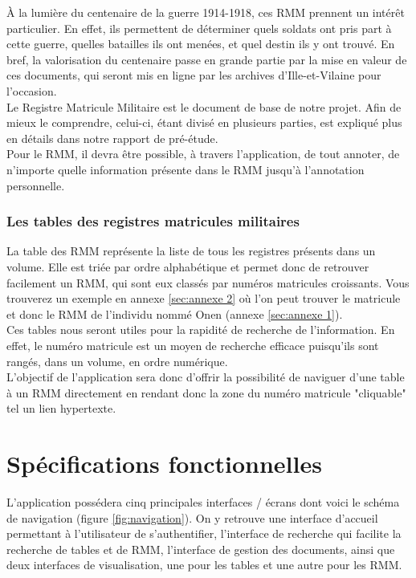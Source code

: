 \documentclass[a4paper]{article}
\begin{document}
	\`A la lumière du centenaire de la guerre 1914-1918, ces RMM prennent un intérêt particulier. En effet, ils permettent de déterminer quels soldats ont pris part à cette guerre, quelles batailles ils ont menées, et quel destin ils y ont trouvé. En bref, la valorisation du centenaire passe en grande partie par la mise en valeur de ces documents, qui seront mis en ligne par les archives d'Ille-et-Vilaine pour l'occasion.\\

	Le Registre Matricule Militaire est le document de base de notre projet. Afin de mieux le comprendre, celui-ci, étant divisé en plusieurs parties, est expliqué plus en détails dans notre rapport de pré-étude.\\

	Pour le RMM, il devra être possible, à travers l'application, de tout annoter, de n'importe quelle information présente dans le RMM jusqu'à l'annotation personnelle. 

\subsubsection{Les tables des registres matricules militaires}
	La table des RMM représente la liste de tous les registres présents dans un volume. Elle est triée par ordre alphabétique et permet donc de retrouver facilement un RMM, qui sont eux classés par numéros matricules croissants. Vous trouverez un exemple en annexe \ref{sec:annexe 2} où l'on peut trouver le matricule et donc le RMM de l'individu nommé Onen (annexe \ref{sec:annexe 1}).\\

	Ces tables nous seront utiles pour la rapidité de recherche de l'information. En effet, le numéro matricule est un moyen de recherche efficace puisqu'ils sont rangés, dans un volume, en ordre numérique. \\

	L'objectif de l'application sera donc d'offrir la possibilité de naviguer d'une table à un RMM directement en rendant donc la zone du numéro matricule "cliquable" tel un lien hypertexte.\\

\section{Spécifications fonctionnelles}

	L’application possédera cinq principales interfaces / écrans dont voici le schéma de navigation (figure \ref{fig:navigation}). On y retrouve une interface d'accueil permettant à l'utilisateur de s'authentifier, l'interface de recherche qui facilite la recherche de tables et de RMM, l'interface de gestion des documents, ainsi que deux interfaces de visualisation, une pour les tables et une autre pour les RMM.
\end{document}
